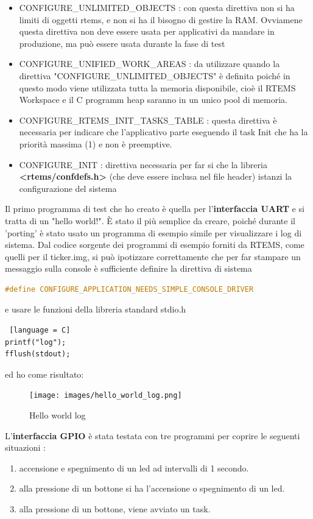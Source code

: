\documentclass[12pt, a4paper, titlepage, oneside]{book}
\begin{document}
\begin{flushleft}
\begin{itemize}
    \item CONFIGURE\_UNLIMITED\_OBJECTS : con questa direttiva non si ha limiti di oggetti rtems, e non si ha il bisogno di gestire la RAM. Ovviamene questa direttiva non deve essere usata per applicativi da mandare in produzione, ma può essere usata durante la fase di test
    \item CONFIGURE\_UNIFIED\_WORK\_AREAS : da utilizzare quando la direttiva "CONFIGURE\_UNLIMITED\_OBJECTS" è definita poiché in questo modo viene utilizzata tutta la memoria disponibile, cioè  il  RTEMS Workspace e il C programm heap saranno in un unico pool di memoria.
    \item CONFIGURE\_RTEMS\_INIT\_TASKS\_TABLE : questa direttiva è necessaria per indicare che l'applicativo parte eseguendo il task Init che ha la priorità massima (1) e non è preemptive.
    \item CONFIGURE\_INIT : direttiva necessaria per far si che la libreria \textbf{<rtems/confdefs.h>} (che deve essere inclusa nel file header) istanzi la configurazione del sistema
\end{itemize}

Il primo programma di test che ho creato è quella per l'\textbf{interfaccia UART} e si tratta di un "hello world!". È stato il più semplice da creare, poiché durante il 'porting' è stato usato un programma di esempio simile per visualizzare i log di sistema. Dal codice sorgente dei programmi di esempio forniti da RTEMS, come quelli per il ticker.img,  si può ipotizzare correttamente che per far stampare un messaggio sulla console è sufficiente definire la direttiva di sistema 
\begin{lstlisting}[language = C]
#define CONFIGURE_APPLICATION_NEEDS_SIMPLE_CONSOLE_DRIVER 
\end{lstlisting} 
e usare le funzioni della libreria standard stdio.h 
\begin{lstlisting} [language = C]
printf("log"); 
fflush(stdout);
\end{lstlisting}
ed ho come risultato:
\begin{figure}[h]
    \centering
    \texttt{[image: images/hello\_world\_log.png]}
    \caption{Hello world log}
    \label{fig:hello_world_log}
\end{figure}
\newpage
L'\textbf{interfaccia GPIO }è stata testata con tre programmi per coprire le seguenti situazioni :
\begin{enumerate}
    \item accensione e spegnimento di un led ad intervalli di 1 secondo.
    \item alla pressione di un bottone si ha l'accensione o spegnimento di un led.
    \item alla pressione di un bottone, viene avviato un task.
\end{enumerate}


\end{flushleft}
\end{document}

